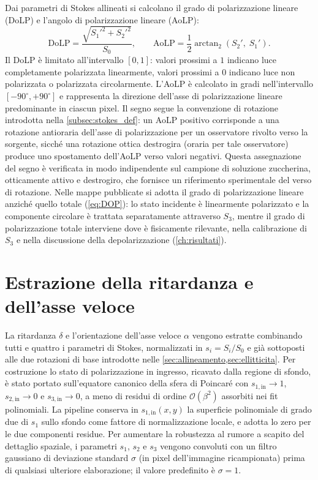 Dai parametri di Stokes allineati si calcolano il grado di polarizzazione lineare (DoLP) e l'angolo di polarizzazione lineare (AoLP):
\begin{equation}
    \mathrm{DoLP} = \frac{\sqrt{S_1'^2 + S_2'^2}}{S_0}, \qquad \mathrm{AoLP} = \frac{1}{2}\arctan_2\!\left(S_2',\; S_1'\right).
    \label{eq:dolp_aolp}
\end{equation}
Il DoLP è limitato all'intervallo $[0, 1]$: valori prossimi a $1$ indicano luce completamente polarizzata linearmente, valori prossimi a $0$ indicano luce non polarizzata o polarizzata circolarmente. L'AoLP è calcolato in gradi nell'intervallo $[-90^\circ, +90^\circ]$ e rappresenta la direzione dell'asse di polarizzazione lineare predominante in ciascun pixel. Il segno segue la convenzione di rotazione introdotta nella \cref{subsec:stokes_def}: un AoLP positivo corrisponde a una rotazione antioraria dell'asse di polarizzazione per un osservatore rivolto verso la sorgente, sicché una rotazione ottica destrogira (oraria per tale osservatore) produce uno spostamento dell'AoLP verso valori negativi. Questa assegnazione del segno è verificata in modo indipendente sul campione di soluzione zuccherina, otticamente attivo e destrogiro, che fornisce un riferimento sperimentale del verso di rotazione. Nelle mappe pubblicate si adotta il grado di polarizzazione lineare anziché quello totale (\cref{eq:DOP}): lo stato incidente è linearmente polarizzato e la componente circolare è trattata separatamente attraverso $S_3$, mentre il grado di polarizzazione totale interviene dove è fisicamente rilevante, nella calibrazione di $S_3$ e nella discussione della depolarizzazione (\cref{ch:risultati}).

\section{Estrazione della ritardanza e dell'asse veloce}
\label{sec:retardance}

La ritardanza $\delta$ e l'orientazione dell'asse veloce $\alpha$ vengono estratte combinando tutti e quattro i parametri di Stokes, normalizzati in $s_i = S_i/S_0$ e già sottoposti alle due rotazioni di base introdotte nelle \cref{sec:allineamento,sec:ellitticita}. Per costruzione lo stato di polarizzazione in ingresso, ricavato dalla regione di sfondo, è stato portato sull'equatore canonico della sfera di Poincaré con $s_{1,\mathrm{in}} \to 1$, $s_{2,\mathrm{in}} \to 0$ e $s_{3,\mathrm{in}} \to 0$, a meno di residui di ordine $\mathcal{O}(\beta^2)$ assorbiti nei fit polinomiali. La pipeline conserva in $s_{1,\mathrm{in}}(x, y)$ la superficie polinomiale di grado due di $s_1$ sullo sfondo come fattore di normalizzazione locale, e adotta lo zero per le due componenti residue. Per aumentare la robustezza al rumore a scapito del dettaglio spaziale, i parametri $s_1$, $s_2$ e $s_3$ vengono convoluti con un filtro gaussiano di deviazione standard $\sigma$ (in pixel dell'immagine ricampionata) prima di qualsiasi ulteriore elaborazione; il valore predefinito è $\sigma = 1$.

